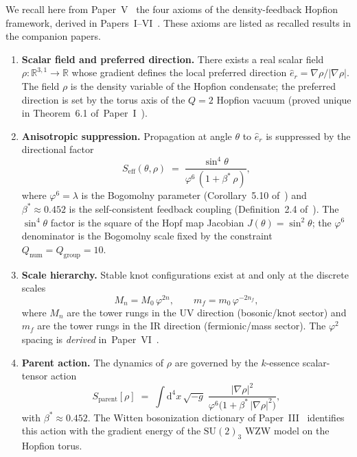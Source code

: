 \documentclass[11pt,a4paper]{article}
\theoremstyle{definition}
\theoremstyle{remark}
\newcommand{\vp}{\varphi}
\newcommand{\bst}{\beta^{*}}
\newcommand{\lam}{\lambda}
\begin{document}
We recall here from Paper~V~\cite{Paper6} the four axioms of the density-feedback Hopfion framework,
derived in Papers~I--VI~\cite{Paper1,Paper2,Paper3,Paper4,Paper5,Paper6}.
These axioms are listed as recalled results in the companion papers.

\begin{enumerate}[label=\textbf{A\arabic*.},leftmargin=*,itemsep=4pt]

\item \textbf{Scalar field and preferred direction.}
There exists a real scalar field $\rho\colon\mathbb{R}^{3,1}\to\mathbb{R}$
whose gradient defines the local preferred direction
$\hat{e}_r = \nabla\rho/|\nabla\rho|$.  The field $\rho$ is the
density variable of the Hopfion condensate; the preferred direction
is set by the torus axis of the $Q=2$ Hopfion vacuum
(proved unique in Theorem~6.1 of~Paper~I~\cite{Paper1}).

\item \textbf{Anisotropic suppression.}
Propagation at angle $\theta$ to $\hat{e}_r$ is suppressed by the
directional factor
\begin{equation}
  S_{\mathrm{eff}}(\theta, \rho)
  \;=\; \frac{\sin^4\!\theta}{\vp^6\,(1 + \bst\,\rho)},
  \label{P8:eq:seff_axiom}
\end{equation}
where $\vp^6 = \lam$ is the Bogomolny parameter
(Corollary~5.10 of~\cite{Paper1}) and $\bst \approx 0.452$
is the self-consistent feedback coupling
(Definition~2.4 of~\cite{Paper1}).
The $\sin^4\!\theta$ factor is the square of the Hopf map Jacobian
$J(\theta) = \sin^2\!\theta$; the $\vp^6$ denominator is the Bogomolny
scale fixed by the constraint $Q_{\mathrm{num}} = Q_{\mathrm{group}} = 10$.

\item \textbf{Scale hierarchy.}
Stable knot configurations exist at and only at the discrete scales
\begin{equation}
  M_n = M_0\,\vp^{2n}, \qquad
  m_f = m_0\,\vp^{-2n_f},
  \label{P8:eq:hierarchy_axiom}
\end{equation}
where $M_n$ are the tower rungs in the UV direction (bosonic/knot sector)
and $m_f$ are the tower rungs in the IR direction (fermionic/mass sector).
The $\vp^2$ spacing is \emph{derived} in~Paper~VI~\cite{Paper6}.

\item \textbf{Parent action.}
The dynamics of $\rho$ are governed by the $k$-essence scalar-tensor
action~\cite{Paper1}
\begin{equation}
  S_{\mathrm{parent}}[\rho]
  \;=\; \int\!\mathrm{d}^4x\,\sqrt{-g}\;
  \frac{|\nabla\rho|^2}{\vp^6\bigl(1 + \bst\,|\nabla\rho|^2\bigr)},
  \label{P8:eq:parent_action}
\end{equation}
with $\bst \approx 0.452$.  The Witten bosonization dictionary of
Paper~III~\cite{Paper3} identifies this action with the gradient energy
of the $\mathrm{SU}(2)_3$ WZW model on the Hopfion torus.
\end{enumerate}
\end{document}

